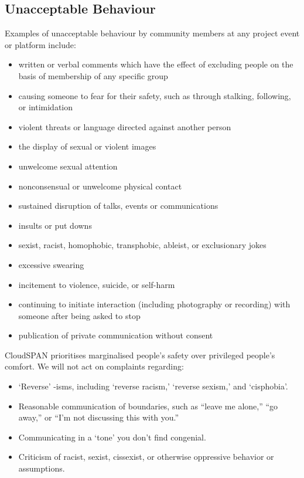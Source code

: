 \documentclass[
]{book}
\providecommand{\tightlist}{%
  \setlength{\itemsep}{0pt}\setlength{\parskip}{0pt}}
\begin{document}
\hypertarget{unacceptable-behaviour}{%
\subsection{Unacceptable Behaviour}\label{unacceptable-behaviour}}

Examples of unacceptable behaviour by community members at any project event or platform include:

\begin{itemize}
\tightlist
\item
  written or verbal comments which have the effect of excluding people on the basis of membership of any specific group
\item
  causing someone to fear for their safety, such as through stalking, following, or intimidation
\item
  violent threats or language directed against another person
\item
  the display of sexual or violent images
\item
  unwelcome sexual attention
\item
  nonconsensual or unwelcome physical contact
\item
  sustained disruption of talks, events or communications
\item
  insults or put downs
\item
  sexist, racist, homophobic, transphobic, ableist, or exclusionary jokes
\item
  excessive swearing
\item
  incitement to violence, suicide, or self-harm
\item
  continuing to initiate interaction (including photography or recording) with someone after being asked to stop
\item
  publication of private communication without consent
\end{itemize}

CloudSPAN prioritises marginalised people's safety over privileged people's comfort. We will not act on complaints regarding:

\begin{itemize}
\tightlist
\item
  `Reverse' -isms, including `reverse racism,' `reverse sexism,' and `cisphobia'.
\item
  Reasonable communication of boundaries, such as ``leave me alone,'' ``go away,'' or ``I'm not discussing this with you.''
\item
  Communicating in a `tone' you don't find congenial.
\item
  Criticism of racist, sexist, cissexist, or otherwise oppressive behavior or assumptions.
\end{itemize}
\end{document}
